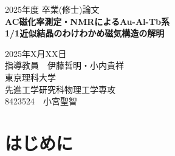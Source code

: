 \documentclass[11pt,a4j]{jreport}
\begin{document}
\thispagestyle{empty}
\begin{center}

\vspace{20mm}
{\Large\noindent 2025年度 卒業(修士)論文}\\
\vspace{40mm}
{\huge\noindent\textbf{AC磁化率測定・NMRによるAu-Al-Tb系}}\\
\medskip
{\huge\noindent\textbf{1/1近似結晶のわけわかめ磁気構造の解明}}\\
\vspace{\baselineskip}
\vspace{40mm}

{\Large\noindent
2025年X月XX日\\
\vspace{\baselineskip}
指導教員　伊藤哲明・小内貴祥 \\
\vspace{\baselineskip}
東京理科大学\\
先進工学研究科物理工学専攻 \\
\vspace{\baselineskip}
8423524　小宮聖智\\
}
\vspace{40mm}

\end{center}

\thispagestyle{empty}
\clearpage


\tableofcontents

\pagestyle{fancy}
\lhead{\rightmark}
\renewcommand{\chaptermark}[1]{\markboth{第\ \normalfont\thechapter\ 章~~#1}{}}

\chapter{はじめに} %
\end{document}
